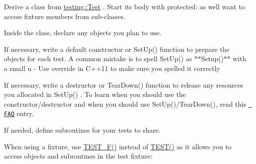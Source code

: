 \begin{DoxyEnumerate}
\item Derive a class from {\ttfamily \mbox{\hyperlink{classtesting_1_1_test}{testing\+::\+Test}}} . Start its body with {\ttfamily protected\+:} as we\textquotesingle{}ll want to access fixture members from sub-\/classes.
\end{DoxyEnumerate}
\begin{DoxyEnumerate}
\item Inside the class, declare any objects you plan to use.
\end{DoxyEnumerate}
\begin{DoxyEnumerate}
\item If necessary, write a default constructor or {\ttfamily Set\+Up()} function to prepare the objects for each test. A common mistake is to spell {\ttfamily Set\+Up()} as $\ast$$\ast${\ttfamily Setup()}$\ast$$\ast$ with a small {\ttfamily u} -\/ Use {\ttfamily override} in C++11 to make sure you spelled it correctly
\end{DoxyEnumerate}
\begin{DoxyEnumerate}
\item If necessary, write a destructor or {\ttfamily Tear\+Down()} function to release any resources you allocated in {\ttfamily Set\+Up()} . To learn when you should use the constructor/destructor and when you should use {\ttfamily Set\+Up()/\+Tear\+Down()}, read this \href{faq.md\#should-i-use-the-constructordestructor-of-the-test-fixture-or-setupteardown}{\texttt{ F\+AQ}} entry.
\end{DoxyEnumerate}
\begin{DoxyEnumerate}
\item If needed, define subroutines for your tests to share.
\end{DoxyEnumerate}

When using a fixture, use {\ttfamily \mbox{\hyperlink{googletest-master_2googletest_2include_2gtest_2gtest_8h_a0ee66d464d1a06c20c1929cae09d8758}{T\+E\+S\+T\+\_\+\+F()}}} instead of {\ttfamily \mbox{\hyperlink{googletest-master_2googletest_2include_2gtest_2gtest_8h_ab5540a6d621853916be8240ff51819cf}{T\+E\+S\+T()}}} as it allows you to access objects and subroutines in the test fixture\+:


\begin{DoxyCode}{0}
\DoxyCodeLine{\}}
\end{DoxyCode}


